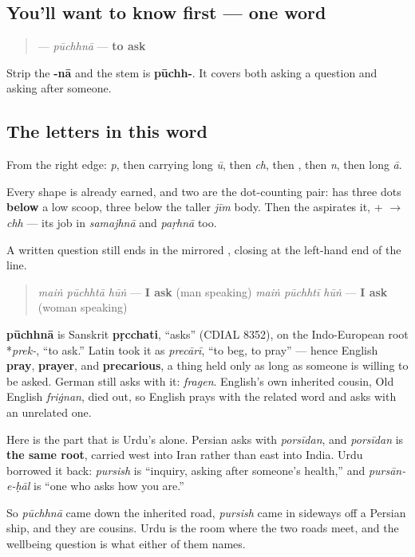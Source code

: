 \subsection*{You'll want to know first — one word}
\begin{quote}
\textbf{} — \emph{pūchhnā} — \textbf{to ask}
\end{quote}

Strip the \textbf{-nā} and the stem is \textbf{pūchh-}. It covers both asking a question and asking after someone.

\subsection*{The letters in this word}
From the right edge: \textbf{} \emph{p}, then \textbf{} carrying long \emph{ū}, then \textbf{} \emph{ch}, then \textbf{}, then \textbf{} \emph{n}, then \textbf{} long \emph{ā}.

Every shape is already earned, and two are the dot-counting pair: \textbf{} has three dots \textbf{below} a low scoop, \textbf{} three below the taller \emph{jīm} body. Then the \textbf{} aspirates it, \textbf{} + \textbf{} $\to$ \textbf{} \emph{chh} — its job in \emph{samajhnā} and \emph{paṛhnā} too.

A written question still ends in the mirrored \textbf{}, closing \textbf{    } at the left-hand end of the line.

\begin{grammarlens}[title={Grammar Lens: into the frame}]
\begin{quote}
\emph{maiṅ pūchhtā hūṅ} — \textbf{I ask} (man speaking) \emph{maiṅ pūchhtī hūṅ} — \textbf{I ask} (woman speaking)
\end{quote}
\end{grammarlens}

\begin{cousinweb}
\textbf{pūchhnā} is Sanskrit \textbf{pṛcchati}, “asks” (CDIAL 8352), on the Indo-European root *\emph{prek-}, “to ask.” Latin took it as \emph{precārī}, “to beg, to pray” — hence English \textbf{pray}, \textbf{prayer}, and \textbf{precarious}, a thing held only as long as someone is willing to be asked. German still asks with it: \emph{fragen}. English's own inherited cousin, Old English \emph{friġnan}, died out, so English prays with the related word and asks with an unrelated one.

Here is the part that is Urdu's alone. Persian asks with \emph{porsīdan}, and \emph{porsīdan} is \textbf{the same root}, carried west into Iran rather than east into India. Urdu borrowed it back: \textbf{} \emph{pursish} is “inquiry, asking after someone's health,” and \emph{pursān-e-ḥāl} is “one who asks how you are.”

So \emph{pūchhnā} came down the inherited road, \emph{pursish} came in sideways off a Persian ship, and they are cousins. Urdu is the room where the two roads meet, and the wellbeing question \textbf{  } is what either of them names.
\end{cousinweb}

